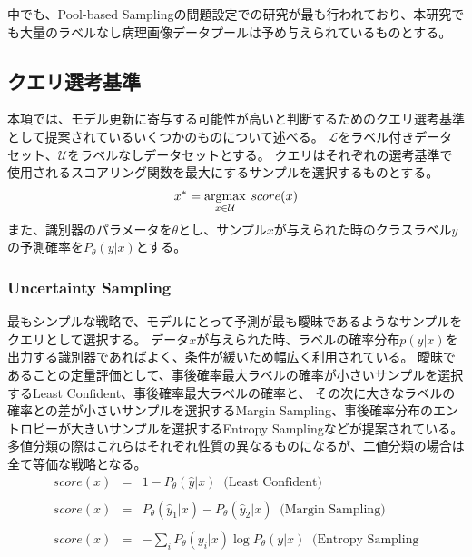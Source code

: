 中でも、Pool-based Samplingの問題設定での研究が最も行われており、本研究でも大量のラベルなし病理画像データプールは予め与えられているものとする。

\subsection{クエリ選考基準}
\label{query_strategy}
本項では、モデル更新に寄与する可能性が高いと判断するためのクエリ選考基準として提案されているいくつかのものについて述べる。
$\mathcal{L}$をラベル付きデータセット、$\mathcal{U}$をラベルなしデータセットとする。
クエリはそれぞれの選考基準で使用されるスコアリング関数を最大にするサンプルを選択するものとする。
\begin{eqnarray}
    x^{*} = \argmax_{x \in \mathcal{U}} \: score(x)
\end{eqnarray}
また、識別器のパラメータを$\theta$とし、サンプル$x$が与えられた時のクラスラベル$y$の予測確率を$P_{\theta}(y|x)$とする。

\subsubsection{Uncertainty Sampling}
最もシンプルな戦略で、モデルにとって予測が最も曖昧であるようなサンプルをクエリとして選択する。
データ$x$が与えられた時、ラベルの確率分布$p(y|x)$を出力する識別器であればよく、条件が緩いため幅広く利用されている。
曖昧であることの定量評価として、事後確率最大ラベルの確率が小さいサンプルを選択するLeast Confident、事後確率最大ラベルの確率と、
その次に大きなラベルの確率との差が小さいサンプルを選択するMargin Sampling、事後確率分布のエントロピーが大きいサンプルを選択するEntropy Samplingなどが提案されている。
多値分類の際はこれらはそれぞれ性質の異なるものになるが、二値分類の場合は全て等価な戦略となる。
\begin{eqnarray}
    score(x) &=& 1 - P_{\theta}(\hat{y}|x)  \;\; \mbox{(Least Confident)} \\ \nonumber \\ 
    score(x) &=& P_{\theta}(\hat{y}_1|x) - P_{\theta}(\hat{y}_2|x)  \;\; \mbox{(Margin Sampling)} \\ \nonumber \\
    score(x) &=& - \sum_i {P_{\theta}(y_i|x)} \log P_{\theta}(y|x)  \;\; \mbox{(Entropy Sampling}
\end{eqnarray}


